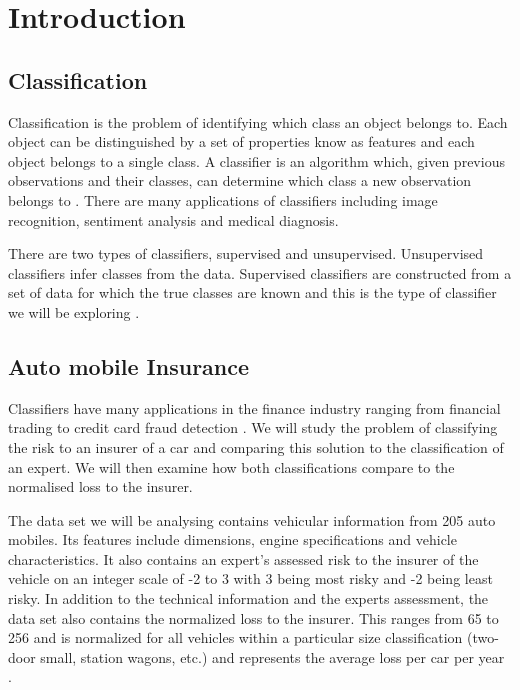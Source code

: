 \chapter{Introduction}

\section{Classification}

Classification is the problem of identifying which class an object belongs to.
Each object can be distinguished by a set of properties know as features and each object belongs to a single class.
A classifier is an algorithm which, given previous observations and their classes, can determine which class a new observation belongs to \cite{Theodoridis03}.
There are many applications of classifiers including image recognition, sentiment analysis and medical diagnosis.

There are two types of classifiers, supervised and unsupervised.
Unsupervised classifiers infer classes from the data.
Supervised classifiers are constructed from a set of data for which the true classes are known and this is the type of classifier we will be exploring \cite{Michie94}.

\section{Auto mobile Insurance}

Classifiers have many applications in the finance industry ranging from financial trading \cite{Gerlein16} to credit card fraud detection \cite{Pozzolo15}.
We will study the problem of classifying the risk to an insurer of a car and comparing this solution to the classification of an expert.
We will then examine how both classifications compare to the normalised loss to the insurer.

The data set we will be analysing contains vehicular information from 205 auto mobiles.
Its features include dimensions, engine specifications and vehicle characteristics.
It also contains an expert's assessed risk to the insurer of the vehicle on an integer scale of -2 to 3 with 3 being most risky and -2 being least risky.
In addition to the technical information and the experts assessment, the data set also contains the normalized loss to the insurer.
This ranges from 65 to 256 and is normalized for all vehicles within a particular size classification (two-door small, station wagons, etc.) and represents the average loss per car per year \cite{Automobile}.
